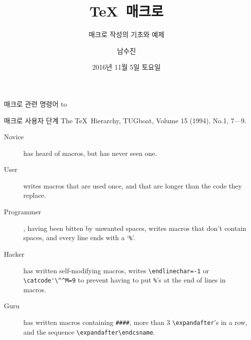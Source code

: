 \documentclass{beamer}
\title{\TeX\ 매크로}
\subtitle{매크로 작성의 기초와 예제}
\date{2016년 11월 5일 토요일}
\author{남수진}
\institute{
  2016 공주대학교 문서작성 워크숍 2016\\
  공주대학교 인문사회과학관 1층 컴퓨터실 107호}
\begin{document}
\maketitle

%
\begin{frame}{매크로 관련 명령어}
  \vspace{4mm}
  \hbox to
\end{frame}


%
\begin{frame}[fragile]{매크로 사용자 단계}
  The \TeX\ Hierarchy, TUGboat, Volume 15 (1994), No.1, 7---9.
  \begin{description}
  \item [Novice] has heard of macros, but has never seen one.
  \item [User] writes macros that are used once, and that are
    longer than the code they replace.
  \item [Programmer], having been bitten by unwanted spaces,
    writes macros that don't contain spaces, and every line ends with
    a `{\small\verb+%+}'.
  \item [Hacker] has written self-modifying macros, writes
    {\small\verb+\endlinechar=-1+} or {\small\verb+\catcode'\^^M=9+}
    to prevent having to put {\small\verb+%+}'s at the end of lines in macros.
  \item [Guru] has written macros containing {\small\verb+####+}, more than 3
    {\small\verb+\expandafter+}'s in a row, and the sequence
    {\small\verb+\expandafter\endcsname+}.
  \end{description}
\end{frame}
\end{document}
